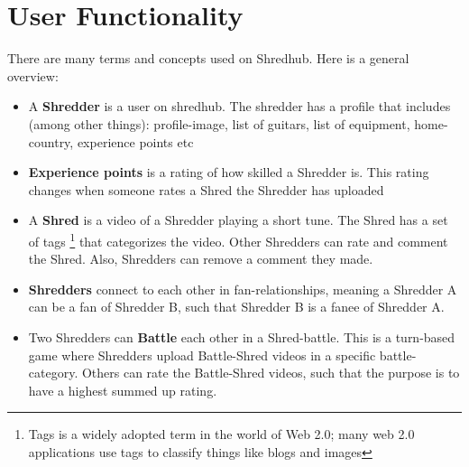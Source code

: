 \section {User Functionality}
There are many terms and concepts used on Shredhub. Here is a general overview:
\begin{itemize}
\item{} A \textbf{Shredder} is a user on shredhub. The shredder has a profile that includes (among other things): profile-image, list of guitars, list of equipment, home-country, experience points etc
\item{} \textbf{Experience points} is a rating of how skilled a Shredder is. This rating changes when someone rates a Shred the Shredder has uploaded
\item{} A \textbf{Shred} is a video of a Shredder playing a short tune. The Shred has a set of tags \footnote{Tags is a widely adopted term in the world of Web 2.0\cite{web20book}; many web 2.0 applications use tags to classify things like blogs and images} that categorizes the video. Other Shredders can rate and comment the Shred. Also, Shredders can remove a comment they made.
\item{} \textbf{Shredders} connect to each other in fan-relationships, meaning a Shredder A can be a fan of Shredder B, such that Shredder B is a fanee of Shredder A. 
\item{} Two Shredders can \textbf{Battle} each other in a Shred-battle. This is a turn-based game where Shredders upload Battle-Shred videos in a specific battle-category. Others can rate the Battle-Shred videos, such that the purpose is to have a highest summed up rating. 
\end{itemize}
		
